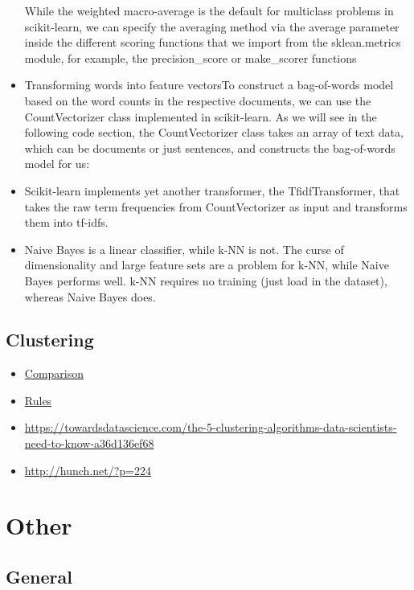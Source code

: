\documentclass[]{book}
\theoremstyle{definition}
\theoremstyle{definition}
\theoremstyle{definition}
\theoremstyle{remark}
\begin{document}
\begin{itemize}
  While the weighted macro-average is the default for multiclass
  problems in scikit-learn, we can specify the averaging method via the
  average parameter inside the different scoring functions that we
  import from the sklean.metrics module, for example, the
  precision\_score or make\_scorer functions
\item
  Transforming words into feature vectorsTo construct a bag-of-words
  model based on the word counts in the respective documents, we can use
  the CountVectorizer class implemented in scikit-learn. As we will see
  in the following code section, the CountVectorizer class takes an
  array of text data, which can be documents or just sentences, and
  constructs the bag-of-words model for us:
\item
  Scikit-learn implements yet another transformer, the TfidfTransformer,
  that takes the raw term frequencies from CountVectorizer as input and
  transforms them into tf-idfs.
\item
  Naive Bayes is a linear classifier, while k-NN is not. The curse of
  dimensionality and large feature sets are a problem for k-NN, while
  Naive Bayes performs well. k-NN requires no training (just load in the
  dataset), whereas Naive Bayes does.
\end{itemize}

\subsection{Clustering}\label{clustering}

\begin{itemize}
\item
  \href{http://scikit-learn.org/stable/modules/clustering.html\#clustering}{Comparison}
\item
  \href{https://twitter.com/thomaswdinsmore/status/965223193043718145}{Rules}
\item
  \url{https://towardsdatascience.com/the-5-clustering-algorithms-data-scientists-need-to-know-a36d136ef68}
\item
  \url{http://hunch.net/?p=224}
\end{itemize}

\section{Other}\label{other-2}

\subsection{General}\label{general-4}
\end{document}

